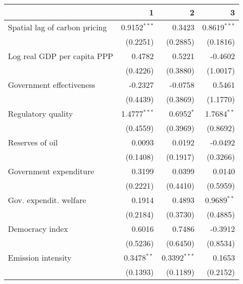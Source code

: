 \begin{tabular}{lrrr}
\toprule
{} &                 1 &                 2 &                 3 \\
\midrule
Spatial lag of carbon pricing    &  0.9152$^{* * *}$ &            0.3423 &  0.8619$^{* * *}$ \\
                                 &          (0.2251) &          (0.2885) &          (0.1816) \\
Log real GDP per capita PPP      &            0.4782 &            0.5221 &           -0.4602 \\
                                 &          (0.4226) &          (0.3880) &          (1.0017) \\
Government effectiveness         &           -0.2327 &           -0.0758 &            0.5461 \\
                                 &          (0.4439) &          (0.3869) &          (1.1770) \\
Regulatory quality               &  1.4777$^{* * *}$ &      0.6952$^{*}$ &    1.7684$^{* *}$ \\
                                 &          (0.4559) &          (0.3969) &          (0.8692) \\
Reserves of oil                  &            0.0093 &            0.0192 &           -0.0492 \\
                                 &          (0.1408) &          (0.1917) &          (0.3266) \\
Government expenditure           &            0.3199 &            0.0399 &            0.0140 \\
                                 &          (0.2221) &          (0.4410) &          (0.5959) \\
Gov. expendit. welfare           &            0.1914 &            0.4893 &    0.9689$^{* *}$ \\
                                 &          (0.2184) &          (0.3730) &          (0.4885) \\
Democracy index                  &            0.6016 &            0.7486 &           -0.3912 \\
                                 &          (0.5236) &          (0.6450) &          (0.8534) \\
Emission intensity               &    0.3478$^{* *}$ &  0.3392$^{* * *}$ &            0.1653 \\
                                 &          (0.1393) &          (0.1189) &          (0.2152) \\

\end{tabular}
